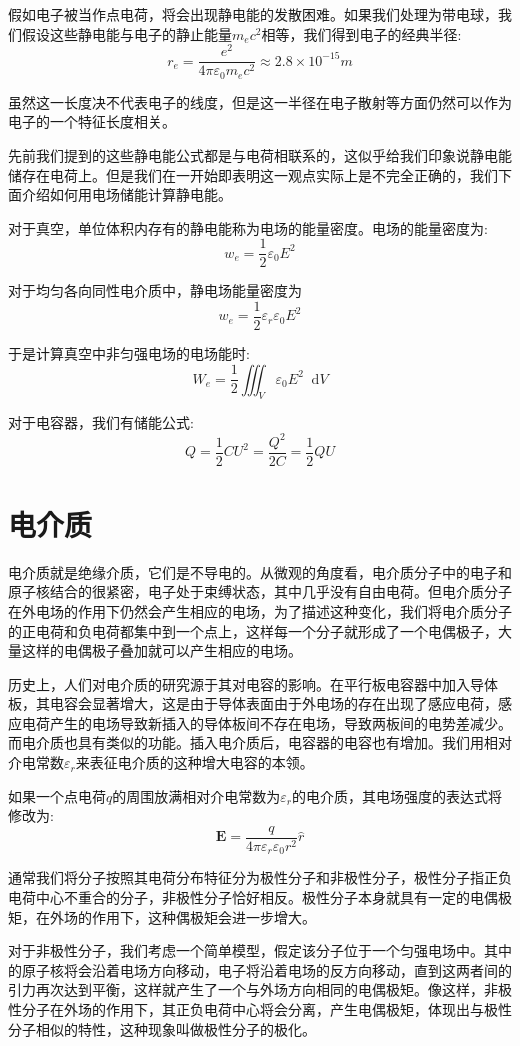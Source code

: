 \documentclass[12pt,a4paper,oneside]{report}
\theoremstyle{definition}
\theoremstyle{remark}
\renewcommand{\d}{\mathop{}\!\mathrm{d}}
\begin{document}
假如电子被当作点电荷，将会出现静电能的发散困难。如果我们处理为带电球，我们假设这些静电能与电子的静止能量$m_ec^2$相等，我们得到电子的经典半径:
\[
r_e=\frac{e^2}{4\pi\varepsilon_0m_ec^2}\approx 2.8\times10^{-15}m
\]
 
虽然这一长度决不代表电子的线度，但是这一半径在电子散射等方面仍然可以作为电子的一个特征长度相关。

先前我们提到的这些静电能公式都是与电荷相联系的，这似乎给我们印象说静电能储存在电荷上。但是我们在一开始即表明这一观点实际上是不完全正确的，我们下面介绍如何用电场储能计算静电能。

对于真空，单位体积内存有的静电能称为电场的能量密度。电场的能量密度为:
\[
w_e=\frac{1}{2}\varepsilon_0E^2
\]

对于均匀各向同性电介质中，静电场能量密度为
\[
w_e=\frac{1}{2}\varepsilon_r\varepsilon_0E^2
\]

于是计算真空中非匀强电场的电场能时:
\[
W_e = \frac{1}{2} \iiint_V \varepsilon_0 E^2 \d V
\]

对于电容器，我们有储能公式:
\[
Q=\frac{1}{2}CU^2 = \frac{Q^2}{2C} = \frac{1}{2}QU
\]

\section{电介质}
电介质就是绝缘介质，它们是不导电的。从微观的角度看，电介质分子中的电子和原子核结合的很紧密，电子处于束缚状态，其中几乎没有自由电荷。但电介质分子在外电场的作用下仍然会产生相应的电场，为了描述这种变化，我们将电介质分子的正电荷和负电荷都集中到一个点上，这样每一个分子就形成了一个电偶极子，大量这样的电偶极子叠加就可以产生相应的电场。

历史上，人们对电介质的研究源于其对电容的影响。在平行板电容器中加入导体板，其电容会显著增大，这是由于导体表面由于外电场的存在出现了感应电荷，感应电荷产生的电场导致新插入的导体板间不存在电场，导致两板间的电势差减少。而电介质也具有类似的功能。插入电介质后，电容器的电容也有增加。我们用相对介电常数$\varepsilon_r$来表征电介质的这种增大电容的本领。

如果一个点电荷$q$的周围放满相对介电常数为$\varepsilon_r$的电介质，其电场强度的表达式将修改为:
\[
\mathbf{E}=\frac{q}{4\pi\varepsilon_r\varepsilon_0r^2}\hat{r}
\]

通常我们将分子按照其电荷分布特征分为极性分子和非极性分子，极性分子指正负电荷中心不重合的分子，非极性分子恰好相反。极性分子本身就具有一定的电偶极矩，在外场的作用下，这种偶极矩会进一步增大。

对于非极性分子，我们考虑一个简单模型，假定该分子位于一个匀强电场中。其中的原子核将会沿着电场方向移动，电子将沿着电场的反方向移动，直到这两者间的引力再次达到平衡，这样就产生了一个与外场方向相同的电偶极矩。像这样，非极性分子在外场的作用下，其正负电荷中心将会分离，产生电偶极矩，体现出与极性分子相似的特性，这种现象叫做极性分子的极化。
\end{document}
